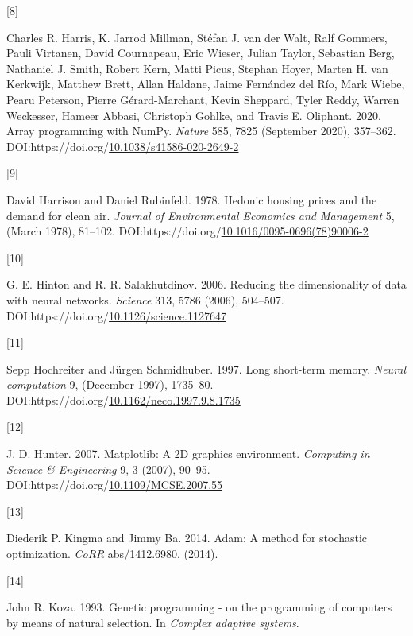 \documentclass[
  11pt,
]{article}
\newlength{\cslhangindent}
\newlength{\csllabelwidth}
\newlength{\cslentryspacingunit} %
\newenvironment{CSLReferences}[2] %
 {%
  \setlength{\parindent}{0pt}
  \ifodd #1
  \let\oldpar\par
  \def\par{\hangindent=\cslhangindent\oldpar}
  \fi
  \setlength{\parskip}{#2\cslentryspacingunit}
 }%
 {}
\newcommand{\CSLLeftMargin}[1]{\parbox[t]{\csllabelwidth}{#1}}
\newcommand{\CSLRightInline}[1]{\parbox[t]{\linewidth - \csllabelwidth}{#1}\break}
\begin{document}
\begin{CSLReferences}{0}{0}
\leavevmode{}%
\CSLLeftMargin{{[}8{]} }%
\CSLRightInline{Charles R. Harris, K. Jarrod Millman, Stéfan J. van der Walt, Ralf Gommers, Pauli Virtanen, David Cournapeau, Eric Wieser, Julian Taylor, Sebastian Berg, Nathaniel J. Smith, Robert Kern, Matti Picus, Stephan Hoyer, Marten H. van Kerkwijk, Matthew Brett, Allan Haldane, Jaime Fernández del Río, Mark Wiebe, Pearu Peterson, Pierre Gérard-Marchant, Kevin Sheppard, Tyler Reddy, Warren Weckesser, Hameer Abbasi, Christoph Gohlke, and Travis E. Oliphant. 2020. Array programming with {NumPy}. \emph{Nature} 585, 7825 (September 2020), 357--362. DOI:https://doi.org/\href{https://doi.org/10.1038/s41586-020-2649-2}{10.1038/s41586-020-2649-2}}

\leavevmode{}%
\CSLLeftMargin{{[}9{]} }%
\CSLRightInline{David Harrison and Daniel Rubinfeld. 1978. Hedonic housing prices and the demand for clean air. \emph{Journal of Environmental Economics and Management} 5, (March 1978), 81--102. DOI:https://doi.org/\href{https://doi.org/10.1016/0095-0696(78)90006-2}{10.1016/0095-0696(78)90006-2}}

\leavevmode{}%
\CSLLeftMargin{{[}10{]} }%
\CSLRightInline{G. E. Hinton and R. R. Salakhutdinov. 2006. Reducing the dimensionality of data with neural networks. \emph{Science} 313, 5786 (2006), 504--507. DOI:https://doi.org/\href{https://doi.org/10.1126/science.1127647}{10.1126/science.1127647}}

\leavevmode{}%
\CSLLeftMargin{{[}11{]} }%
\CSLRightInline{Sepp Hochreiter and Jürgen Schmidhuber. 1997. Long short-term memory. \emph{Neural computation} 9, (December 1997), 1735--80. DOI:https://doi.org/\href{https://doi.org/10.1162/neco.1997.9.8.1735}{10.1162/neco.1997.9.8.1735}}

\leavevmode{}%
\CSLLeftMargin{{[}12{]} }%
\CSLRightInline{J. D. Hunter. 2007. Matplotlib: A 2D graphics environment. \emph{Computing in Science \& Engineering} 9, 3 (2007), 90--95. DOI:https://doi.org/\href{https://doi.org/10.1109/MCSE.2007.55}{10.1109/MCSE.2007.55}}

\leavevmode{}%
\CSLLeftMargin{{[}13{]} }%
\CSLRightInline{Diederik P. Kingma and Jimmy Ba. 2014. Adam: A method for stochastic optimization. \emph{CoRR} abs/1412.6980, (2014).}

\leavevmode{}%
\CSLLeftMargin{{[}14{]} }%
\CSLRightInline{John R. Koza. 1993. Genetic programming - on the programming of computers by means of natural selection. In \emph{Complex adaptive systems}.}


\end{CSLReferences}
\end{document}
